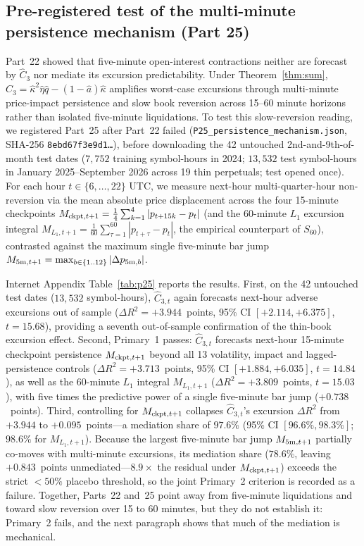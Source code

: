 \documentclass[12pt]{article}
\theoremstyle{definition}
\theoremstyle{remark}
\begin{document}
\subsection{Pre-registered test of the multi-minute persistence mechanism (Part 25)}\label{sec:p25}
Part~22 showed that five-minute open-interest contractions neither are forecast by $\hat C_3$ nor mediate its excursion predictability. Under Theorem~\ref{thm:sum}, $\hat C_3=\hat\kappa^2\hat\eta\hat q-(1-\hat a)\hat\kappa$ amplifies worst-case excursions through multi-minute price-impact persistence and slow book reversion across 15--60 minute horizons rather than isolated five-minute liquidations. To test this slow-reversion reading, we registered Part~25 after Part~22 failed (\texttt{P25\_persistence\_mechanism.json}, SHA-256 \texttt{8ebd67f3e9d1\ldots}), before downloading the 42 untouched 2nd-and-9th-of-month test dates ($7{,}752$ training symbol-hours in 2024; $13{,}532$ test symbol-hours in January 2025--September 2026 across 19 thin perpetuals; test opened once). For each hour $t\in\{6,\dots,22\}$ UTC, we measure next-hour multi-quarter-hour non-reversion via the mean absolute price displacement across the four 15-minute checkpoints $M_{{\rm ckpt},t+1}=\frac{1}{4}\sum_{k=1}^4|p_{t+15k}-p_t|$ (and the 60-minute $L_1$ excursion integral $M_{L_1,t+1}=\frac{1}{60}\sum_{\tau=1}^{60}|p_{t+\tau}-p_t|$, the empirical counterpart of $S_{60}$), contrasted against the maximum single five-minute bar jump $M_{5{\rm m},t+1}=\max_{b\in\{1..12\}}|\Delta p_{5{\rm m},b}|$.



Internet Appendix Table~\ref{tab:p25} reports the results. First, on the 42 untouched test dates ($13{,}532$ symbol-hours), $\hat C_{3,t}$ again forecasts next-hour adverse excursions out of sample ($\Delta R^2=+3.944$~points, 95\% CI $[+2.114,+6.375]$, $t=15.68$), providing a seventh out-of-sample confirmation of the thin-book excursion effect. Second, Primary~1 passes: $\hat C_{3,t}$ forecasts next-hour 15-minute checkpoint persistence $M_{{\rm ckpt},t+1}$ beyond all 13 volatility, impact and lagged-persistence controls ($\Delta R^2=+3.713$~points, 95\% CI $[+1.884,+6.035]$, $t=14.84$), as well as the 60-minute $L_1$ integral $M_{L_1,t+1}$ ($\Delta R^2=+3.809$~points, $t=15.03$), with five times the predictive power of a single five-minute bar jump ($+0.738$~points). Third, controlling for $M_{{\rm ckpt},t+1}$ collapses $\hat C_{3,t}$'s excursion $\Delta R^2$ from $+3.944$ to $+0.095$~points---a mediation share of $97.6\%$ (95\% CI $[96.6\%,98.3\%]$; $98.6\%$ for $M_{L_1,t+1}$). Because the largest five-minute bar jump $M_{5{\rm m},t+1}$ partially co-moves with multi-minute excursions, its mediation share ($78.6\%$, leaving $+0.843$~points unmediated---$8.9\times$ the residual under $M_{{\rm ckpt},t+1}$) exceeds the strict $<50\%$ placebo threshold, so the joint Primary~2 criterion is recorded as a failure. Together, Parts~22 and~25 point away from five-minute liquidations and toward slow reversion over 15 to 60 minutes, but they do not establish it: Primary~2 fails, and the next paragraph shows that much of the mediation is mechanical.
\end{document}
